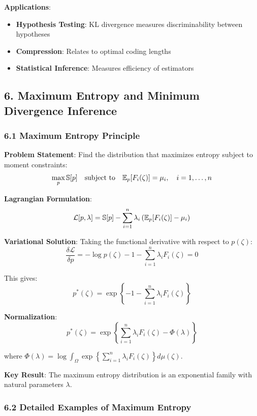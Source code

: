 \documentclass{amsart}
\let\originalmathbb\mathbb
\renewcommand{\mathbb}[1]{%
    \ifstrequal{#1}{1}{\mathbbm{#1}}{\originalmathbb{#1}}%
}
\theoremstyle{plain}
\theoremstyle{definition}
\theoremstyle{remark}
\begin{document}
\textbf{Applications}:

\begin{itemize}
	\item \textbf{Hypothesis Testing}: KL divergence measures discriminability between hypotheses
	\item \textbf{Compression}: Relates to optimal coding lengths
	\item \textbf{Statistical Inference}: Measures efficiency of estimators
\end{itemize}

\subsection{6. Maximum Entropy and Minimum Divergence Inference}

\subsubsection{6.1 Maximum Entropy Principle}

\textbf{Problem Statement}: Find the distribution that maximizes entropy subject to moment constraints:
\[
\max_p \mathbb{S}[p] \quad \text{subject to} \quad \mathbb{E}_p[F_i(\zeta)] = \mu_i, \quad i = 1, \ldots, n
\]

\textbf{Lagrangian Formulation}:
\[
\mathcal{L}[p, \lambda] = \mathbb{S}[p] - \sum_{i=1}^n \lambda_i \left(\mathbb{E}_p[F_i(\zeta)] - \mu_i\right)
\]

\textbf{Variational Solution}:
Taking the functional derivative with respect to $p(\zeta)$:
\[
\frac{\delta \mathcal{L}}{\delta p} = -\log p(\zeta) - 1 - \sum_{i=1}^n \lambda_i F_i(\zeta) = 0
\]

This gives:
\[
p^{*}(\zeta) = \exp\left\{-1 - \sum_{i=1}^n \lambda_i F_i(\zeta)\right\}
\]

\textbf{Normalization}:
\[
p^{*}(\zeta) = \exp\left\{\sum_{i=1}^n \lambda_i F_i(\zeta) - \Phi(\lambda)\right\}
\]

where $\Phi(\lambda) = \log \int_{\Omega} \exp\left\{\sum_{i=1}^n \lambda_i F_i(\zeta)\right\} d\mu(\zeta)$.

\textbf{Key Result}: The maximum entropy distribution is an exponential family with natural parameters $\lambda$.

\subsubsection{6.2 Detailed Examples of Maximum Entropy}
\end{document}
